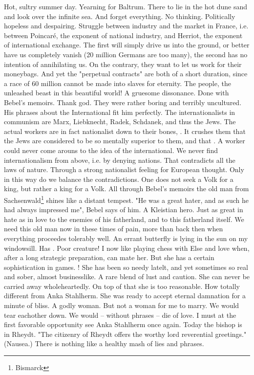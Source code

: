 
Hot, sultry summer day. Yearning for Baltrum. There to lie in the hot dune sand and look over the infinite sea. And forget everything. No thinking. Politically hopeless and despairing. Struggle between industry and the market in France, i.e. between Poincaré, the exponent of national industry, and Herriot, the exponent of international exchange. The first will simply drive us into the ground, or better have us completely vanish (20 million Germans are too many), the second has no intention of annihilating us. On the contrary, they want to let us work for their moneybags. And yet the "perpetual contracts" are both of a short duration, since a race of 60 million cannot be made into slaves for eternity. The people, the unleashed beast in this beautiful world! A gruesome dissonance. Done with Bebel's memoirs. Thank god. They were rather boring and terribly uncultured. His phrases about the International fit him perfectly. The internationalists in communism are Marx, Liebknecht, Radek, Schdanek, and thus the Jews. The actual workers are in fact nationalist down to their bones, . It crushes them that the Jews are considered to be so mentally superior to them, and that . A worker could never come arouns to the idea of the international. We never find internationalism from above, i.e. by denying nations. That contradicts all the laws of nature. Through a strong nationalist feeling for European thought. Only in this way do we balance the contradictions. One does not seek a Volk for a king, but rather a king for a Volk. All through Bebel's memoirs the old man from Sachsenwald\footnote{Bismarck} shines like a distant tempest. "He was a great hater, and as such he had always impressed me", Bebel says of him. A Kleistian hero. Just as great in hate as in love to the enemies of his fatherland, and to this fatherland itself. We need this old man now in these times of pain, more than back then when everything proceedes tolerably well. An errant butterfly is lying in the sun on my windowsill. Has . Poor creature! I now like playing chess with Else and love when, after a long strategic preparation, can mate her. But she has a certain sophistication in games. ! She has been so needy latelt, and yet sometimes so real and sober, almost businesslike. A rare blend of lust and caution. She can never be carried away wholeheartedly. On top of that she is too reasonable. How totally different from Anka Stahlherm. She was ready to accept eternal damnation for a minute of bliss. A godly woman. But not a woman for me to marry. We would tear eachother down. We would -- without phrases -- die of love. I must at the first favorable opportunity see Anka Stahlherm once again. Today the bishop is in Rheydt. "The citizenry of Rheydt offers the worthy lord reverential greetings." (Nausea.) There is nothing like a healthy mash of lies and phrases.